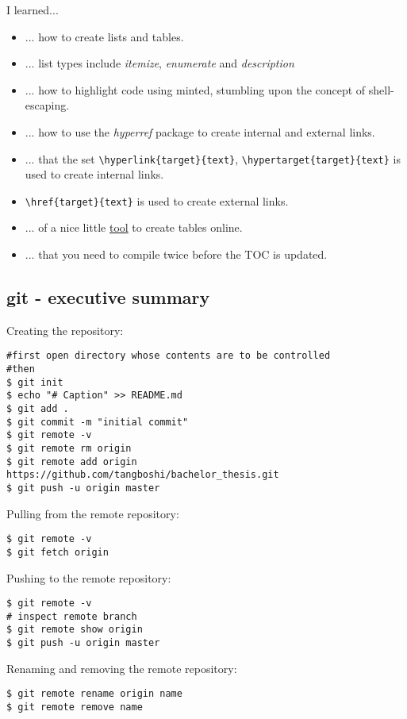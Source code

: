 \documentclass{article}
\begin{document}
I learned...
\begin{itemize} 
	\item ... how to create lists and tables.
	\item ... list types include \emph{itemize}, \emph{enumerate} and \emph{description}
	\item ... how to highlight code using minted, stumbling upon the concept of shell-escaping.
	\item ... how to use the \emph{hyperref} package to create internal and external links.
	\item ... that the set \verb|\hyperlink{target}{text}|, \verb|\hypertarget{target}{text}| is used to create internal links.
	\item \verb|\href{target}{text}| is used to create external links.
	\item ... of a nice little \href{http://www.tablesgenerator.com/}{tool} to create tables online.
	\item  ... that you need to compile twice before the TOC is updated.
\end{itemize}

\subsection{git - executive summary}

Creating the repository:

\begin{verbatim}
#first open directory whose contents are to be controlled
#then
$ git init
$ echo "# Caption" >> README.md
$ git add .
$ git commit -m "initial commit"
$ git remote -v
$ git remote rm origin
$ git remote add origin https://github.com/tangboshi/bachelor_thesis.git
$ git push -u origin master
\end{verbatim}

Pulling from the remote repository:

\begin{verbatim}
$ git remote -v
$ git fetch origin
\end{verbatim}

Pushing to the remote repository:

\begin{verbatim}
$ git remote -v
# inspect remote branch
$ git remote show origin
$ git push -u origin master
\end{verbatim}

Renaming and removing the remote repository:

\begin{verbatim}
$ git remote rename origin name
$ git remote remove name 
\end{verbatim}
\end{document}
